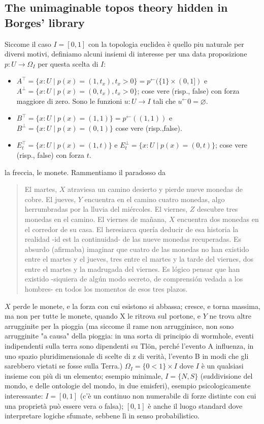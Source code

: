 \documentclass{amsart}
\begin{document}
\subsection{The unimaginable topos theory hidden in Borges' library}
\begin{remark}
  Siccome il caso $I=[0,1]$ con la topologia euclidea è quello piu naturale per diversi motivi, definiamo alcuni insiemi di interesse per una data proposizione $p : U \to \Omega_I$ per questa scelta di $I$:
\begin{itemize}
  \item $A^\top = \{x : U \mid p(x) = (1,t_x), t_x > 0\} = p^\leftarrow(\{1\}\times (0,1])$ e $A^\perp = \{x : U \mid p(x) = (0,t_x), t_x > 0\}$; cose vere (risp., false) con forza maggiore di zero. Sono le funzioni $u : U \to I$ tali che $u^\leftarrow 0 = \varnothing$.
  \item $B^\top = \{x : U \mid p(x) = (1,1)\} = p^\leftarrow((1,1))$ e $B^\perp = \{x : U \mid p(x) = (0,1)\}$ cose vere (risp.,false).
  \item $E_t^\top = \{ x : U \mid p(x)=(1,t)\}$ e $E_t^\perp = \{ x : U \mid p(x)=(0,t)\}$; cose vere (risp., false) con forza $t$.
\end{itemize}
\end{remark}
\begin{example}
  la freccia, le monete. Rammentiamo il paradosso da \cite{} 
  \begin{quote}
    El martes, $X$ atraviesa un camino desierto y pierde nueve monedas de cobre.
    El jueves, $Y$ encuentra en el camino cuatro monedas, algo herrumbradas por la
    lluvia del miércoles. El viernes, $Z$ descubre tres monedas en el camino. El viernes
    de mañana, $X$ encuentra dos monedas en el corredor de su casa. El heresiarca
    quería deducir de esa historia la realidad -id est la continuidad- de las nueve
    monedas recuperadas. Es absurdo (afirmaba) imaginar que cuatro de las
    monedas no han existido entre el martes y el jueves, tres entre el martes y la
    tarde del viernes, dos entre el martes y la madrugada del viernes. Es lógico
    pensar que han existido -siquiera de algún modo secreto, de comprensión vedada
    a los hombres- en todos los momentos de esos tres plazos. 
  \end{quote}
  $X$ perde le monete, e la forza con cui esistono si abbassa; cresce, e torna massima, ma non per tutte le monete, quando X le ritrova sul portone,  e $Y$ ne trova altre arrugginite per la pioggia (ma siccome il rame non arrugginisce, non sono arrugginite "a causa" della pioggia: in una sorta di principio di wormhole, eventi indipendenti sulla terra sono dipendenti su Tlön, perché l'evento A influenza, in uno spazio pluridimensionale di scelte di z di verità, l'evento B in modi che gli sarebbero vietati se fosse sulla Terra.) $\Omega_I = \{0<1\}\times I$ dove $I$ è un qualsiasi insieme con più di un elemento; esempio minimale, $I=\{N,S\}$ (suddivisione del mondo, e delle ontologie del mondo, in due emisferi), esempio psicologicamente interessante: $I=[0,1]$ (c'è un continuo non numerabile di forze distinte con cui una proprietà può essere vera o falsa); $[0,1]$ è anche il luogo standard dove interpretare logiche sfumate, sebbene lì in senso probabilistico.
\end{example}
\end{document}

